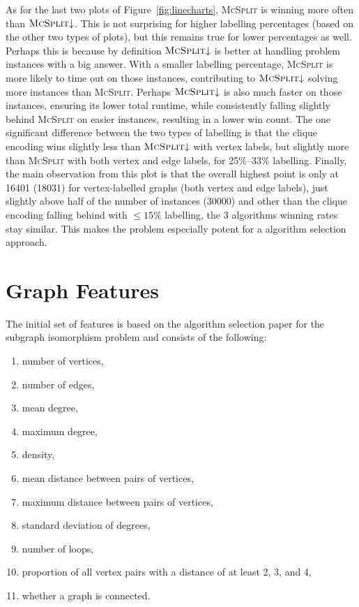 \documentclass{l4proj}
\theoremstyle{definition}
\theoremstyle{remark}
\begin{document}
As for the last two plots of Figure~\ref{fig:linecharts}, \textsc{McSplit} is
winning more often than $\textsc{McSplit}{\downarrow}$. This is not surprising for
higher labelling percentages (based on the other two types of plots), but this
remains true for lower percentages as well. Perhaps this is because by
definition $\textsc{McSplit}{\downarrow}$ is better at handling problem instances
with a big answer. With a smaller labelling percentage, \textsc{McSplit} is more
likely to time out on those instances, contributing to
$\textsc{McSplit}{\downarrow}$ solving more instances than \textsc{McSplit}.
Perhaps $\textsc{McSplit}{\downarrow}$ is also much faster on those instances,
ensuring its lower total runtime, while consistently falling slightly behind
\textsc{McSplit} on easier instances, resulting in a lower win count. The one
significant difference between the two types of labelling is that the clique
encoding wins slightly less than $\textsc{McSplit}{\downarrow}$ with vertex
labels, but slightly more than \textsc{McSplit} with both vertex and edge
labels, for 25\%--33\% labelling. Finally, the main observation from this plot
is that the overall highest point is only at \num{16401} (\num{18031}) for
vertex-labelled graphs (both vertex and edge labels), just slightly above half
of the number of instances (\num{30000}) and other than the clique encoding
falling behind with $\le 15\%$ labelling, the 3 algorithms winning rates stay
similar. This makes the problem especially potent for a algorithm selection
approach.

\section{Graph Features} \label{sec:features}
The initial set of features is based on the algorithm selection paper for the
subgraph isomorphism problem \cite{DBLP:conf/lion/KotthoffMS16} and consists of
the following:

\begin{enumerate}
\item number of vertices,
\item number of edges,
\item mean degree,
\item maximum degree,
\item density,
\item mean distance between pairs of vertices,
\item maximum distance between pairs of vertices,
\item standard deviation of degrees,
\item number of loops,
\item proportion of all vertex pairs with a distance of at least 2, 3, and 4,
\item whether a graph is connected.
\end{enumerate}
\end{document}
